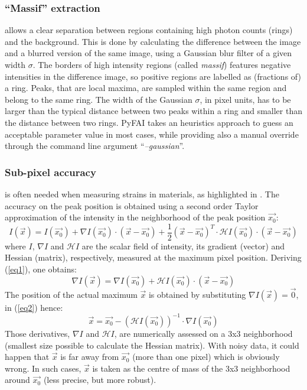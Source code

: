 \documentclass{iucr}
\begin{document}
\subsubsection{``Massif'' extraction}
\label{massif}
allows a clear separation between regions containing high
photon counts (rings) and the background.
This is done by calculating the difference between the image and a blurred version
of the same image, using a Gaussian blur filter of a given width $\sigma$.
The borders of high intensity regions (called \textit{massif}) features
negative intensities in the difference image, so positive regions are labelled
as (fractions of) a ring.
Peaks, that are local maxima,
are sampled within the same region and belong to the same ring.
The width of the Gaussian $\sigma$, in pixel units, has to be larger than the
typical distance between two peaks within a ring and smaller than the distance between two
rings.
PyFAI takes an heuristics approach to guess an acceptable parameter value in
most cases, while providing also a manual override through the command line
argument ``\textit{--gaussian}''.

\subsubsection{Sub-pixel accuracy}
\label{subpixel}
is often needed when measuring strains in materials, as highlighted in
\cite{to5079}.
The accuracy on the peak position is obtained using a second order Taylor
approximation of the intensity in the neighborhood of the peak
position $\overrightarrow{x_0}$:
\begin{equation}
\label{eq1}
I(\overrightarrow{x}) = I(\overrightarrow{x_0}) + \nabla
I(\overrightarrow{x_0})\cdot (\overrightarrow{x}-\overrightarrow{x_0}) +
\frac{1}{2} (\overrightarrow{x}-\overrightarrow{x_0})^T\cdot\mathcal{H}
I(\overrightarrow{x_0})\cdot(\overrightarrow{x}-\overrightarrow{x_0})
\end{equation}
where $I$,
$\nabla I$ and $\mathcal{H} I$ are the scalar field of intensity, its gradient
(vector) and Hessian (matrix), respectively, measured at the maximum pixel position.
Deriving (\ref{eq1}), one obtains:
\begin{equation}
\label{eq2}
\nabla I(\overrightarrow{x}) =\nabla I(\overrightarrow{x_0}) +
\mathcal{H}I(\overrightarrow{x_0})\cdot(\overrightarrow{x}-\overrightarrow{x_0})
\end{equation}
The position of the actual maximum $\overrightarrow{x}$ is obtained by substituting
$\nabla I(\overrightarrow{x})=\overrightarrow{0}$, in (\ref{eq2}) hence:
\begin{equation}
\label{eq3}
\overrightarrow{x} = \overrightarrow{x_0} - (\mathcal{H}
I(\overrightarrow{x_0}))^{-1}\cdot\nabla I(\overrightarrow{x_0})
 \end{equation}
Those derivatives, $\nabla I$ and $\mathcal{H} I$, are numerically assessed
on a 3x3 neighborhood (smallest size possible to calculate the Hessian matrix).
With noisy data, it could happen that
$\overrightarrow{x}$ is far away from $\overrightarrow{x_0}$ (more than one
pixel) which is obviously wrong.
In such cases, $\overrightarrow{x}$ is taken as the centre of mass of the 3x3
neighborhood around $\overrightarrow{x_0}$ (less precise, but more robust).
\end{document}
